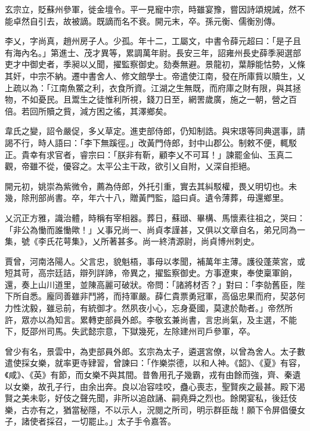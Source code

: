 \begin{pinyinscope}
 玄宗立，貶蘇州參軍，徙金壇令。平一見寵中宗，時雖宴豫，嘗因詩頌規誡，然不能卓然自引去，故被謫。既謫而名不衰。開元末，卒。孫元衡、儒衡別傳。



 李乂，字尚真，趙州房子人。少孤。年十二，工屬文，中書令薛元超曰：「是子且有海內名。」第進士、茂才異等，累調萬年尉。長安三年，詔雍州長史薛季昶選部吏才中御史者，季昶以乂聞，擢監察御史。劾奏無避。景龍初，葉靜能怙勢，乂條其奸，中宗不納。遷中書舍人、修文館學士。帝遣使江南，發在所庫貲以贖生，乂上疏以為：「江南魚鱉之利，衣食所資。江湖之生無既，而府庫之財有限，與其拯物，不如憂民。且鬻生之徒惟利所視，錢刀日至，網罟歲廣，施之一朝，營之百倍。若回所贖之貲，減方困之徭，其澤鄉矣。



 韋氏之變，詔令嚴促，多乂草定。進吏部侍郎，仍知制誥。與宋璟等同典選事，請謁不行，時人語曰：「李下無蹊徑。」改黃門侍郎，封中山郡公。制敕不便，輒駁正。貴幸有求官者，睿宗曰：「朕非有靳，顧李乂不可耳！」諫罷金仙、玉真二觀，帝雖不從，優容之。太平公主干政，欲引乂自附，乂深自拒絕。



 開元初，姚崇為紫微令，薦為侍郎，外托引重，實去其糾駁權，畏乂明切也。未幾，除刑部尚書。卒，年六十八，贈黃門監，謚曰貞。遺令薄葬，毋還鄉里。



 乂沉正方雅，識治體，時稱有宰相器。葬日，蘇頲、畢構、馬懷素往祖之，哭曰：「非公為慟而誰慟歟！」乂事兄尚一、尚貞孝謹甚，又俱以文章自名，弟兄同為一集，號《李氏花萼集》，乂所著甚多。尚一終清源尉，尚貞博州刺史。



 賈曾，河南洛陽人。父言忠，貌魁梧，事母以孝聞，補萬年主薄。護役蓬萊宮，或短其苛，高宗廷詰，辯列詳諦，帝異之，擢監察御史。方事遼東，奉使稟軍餉，還，奏上山川道里，並陳高麗可破狀。帝問：「諸將材否？」對曰：「李勍舊臣，陛下所自悉。龐同善雖非鬥將，而持軍嚴。薛仁貴票勇冠軍，高偘忠果而府，契苾何力性沈毅，雖忌前，有統御才。然夙夜小心，忘身憂國，莫逮於勣者。」帝然所許，眾亦以為知言。累轉吏部員外郎。李敬玄兼尚書，言忠尚氣，及主選，不能下，貶邵州司馬。失武懿宗意，下獄幾死，左除建州司戶參軍，卒。



 曾少有名，景雲中，為吏部員外郎。玄宗為太子，遴選宮僚，以曾為舍人。太子數遣使採女樂，就率更寺肄習，曾諫曰：「作樂崇德，以和人神。《韶》、《夏》有容，《咸》、《英》有節，而女樂不與其間。昔魯用孔子幾霸，戎有由餘而強，齊、秦遺以女樂，故孔子行，由余出奔。良以冶容哇咬，蠱心喪志，聖賢疾之最甚。殿下渴賢之美未彰，好伎之聲先聞，非所以追啟誦、嗣堯舜之烈也。餘閑宴私，後廷伎樂，古亦有之，猶當秘隱，不以示人，況閱之所司，明示群臣哉！願下令屏倡優女子，諸使者採召，一切罷止。」太子手令嘉答。




\end{pinyinscope}
